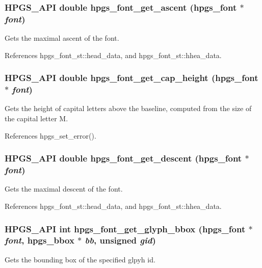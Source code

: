\subsubsection[{hpgs\_\-font\_\-get\_\-ascent}]{\setlength{\rightskip}{0pt plus 5cm}HPGS\_\-API double hpgs\_\-font\_\-get\_\-ascent ({\bf hpgs\_\-font} $\ast$ {\em font})}\label{group__font_ga4c31ff0e52736eb6ab55a3bc0c178b24}
Gets the maximal ascent of the font. 

References hpgs\_\-font\_\-st::head\_\-data, and hpgs\_\-font\_\-st::hhea\_\-data.

\subsubsection[{hpgs\_\-font\_\-get\_\-cap\_\-height}]{\setlength{\rightskip}{0pt plus 5cm}HPGS\_\-API double hpgs\_\-font\_\-get\_\-cap\_\-height ({\bf hpgs\_\-font} $\ast$ {\em font})}\label{group__font_gab75c848878a655dd0a24286772879136}
Gets the height of capital letters above the baseline, computed from the size of the capital letter M. 

References hpgs\_\-set\_\-error().

\subsubsection[{hpgs\_\-font\_\-get\_\-descent}]{\setlength{\rightskip}{0pt plus 5cm}HPGS\_\-API double hpgs\_\-font\_\-get\_\-descent ({\bf hpgs\_\-font} $\ast$ {\em font})}\label{group__font_ga0ba261087b2bb68426ec3924bbf7f2dd}
Gets the maximal descent of the font. 

References hpgs\_\-font\_\-st::head\_\-data, and hpgs\_\-font\_\-st::hhea\_\-data.

\subsubsection[{hpgs\_\-font\_\-get\_\-glyph\_\-bbox}]{\setlength{\rightskip}{0pt plus 5cm}HPGS\_\-API int hpgs\_\-font\_\-get\_\-glyph\_\-bbox ({\bf hpgs\_\-font} $\ast$ {\em font}, \/  {\bf hpgs\_\-bbox} $\ast$ {\em bb}, \/  unsigned {\em gid})}\label{group__font_gaa15d6b275995ad582a992d697e6e69e0}
Gets the bounding box of the specified glpyh id.

